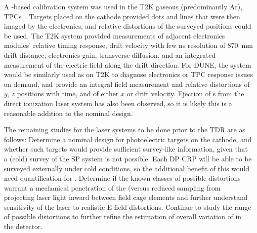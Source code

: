 A \phel{}-based calibration system was used in the T2K gaseous (predominantly Ar), TPCs~\cite{Abgrall:2010hi}. Targets placed on the cathode provided dots and lines that were then imaged by the electronics, and relative distortions of the surveyed positions could be used. The T2K \phel system provided measurements of adjacent electronics modules' relative timing response, drift velocity with few \si{\nano\s} resolution of \SI{870}{\milli\m} drift distance, electronics gain, transverse diffusion, and an integrated measurement of the electric field along the drift direction. For DUNE, the system would be similarly used as on T2K to diagnose electronics or TPC response issues on demand, and provide an integral field measurement and relative distortions of $y$, $z$ positions with time, and of either $x$ or drift velocity. Ejection of \phel{}s from the direct ionization laser system has also been observed, so it is likely this is a reasonable addition to the nominal design.%

The remaining studies for the laser systems to be done prior to the TDR are as follows: 
 Determine a nominal design for photoelectric targets on the cathode, and whether such targets would provide sufficient survey-like information, given that a (cold) survey of the SP system is not possible. Each DP CRP will be able to be surveyed externally under cold conditions, so the additional benefit of this would need quantification for \dual. Determine if the known classes of possible \efield distortions warrant a mechanical penetration of the  (versus reduced sampling from projecting laser light inward between field cage elements and further understand sensitivity of the laser to realistic E field distortions. Continue to study the range of possible \efield distortions to further refine the estimation of overall variation of \efield  in the detector. 


